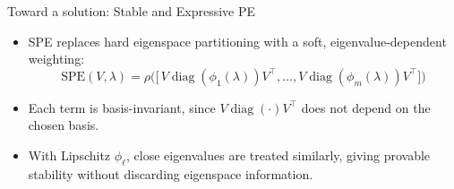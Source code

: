 \documentclass[aspectratio=169,11pt]{beamer}
\begin{document}
\begin{frame}{Toward a solution: Stable and Expressive PE}
  \begin{itemize}
    \item SPE \citep{huang2024stability} replaces hard eigenspace partitioning
          with a \alert{soft}, eigenvalue-dependent weighting:
          \begin{equation*}
            \mathrm{SPE}(V, \lambda) =
            \rho\big(\big[\, V \operatorname{diag}(\phi_1(\lambda)) V^\top,
            \dots, V \operatorname{diag}(\phi_m(\lambda)) V^\top \big]\big)
          \end{equation*}
    \item Each term is basis-invariant, since $V \operatorname{diag}(\cdot) V^\top$
          does not depend on the chosen basis.
    \item With Lipschitz $\phi_\ell$, close eigenvalues are treated similarly,
          giving \alert{provable stability} without discarding eigenspace
          information.
  \end{itemize}
\end{frame}
\end{document}
